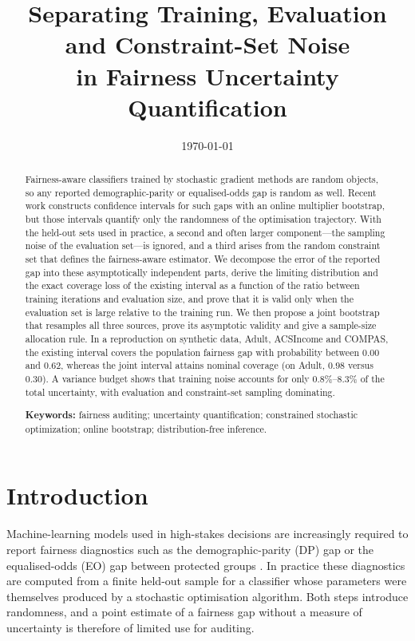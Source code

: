 \documentclass[10pt,twocolumn]{article}
\title{Separating Training, Evaluation and Constraint-Set Noise\\in Fairness Uncertainty Quantification}
\author{\todo{author list}}
\date{\today}
\begin{document}
\maketitle

\begin{abstract}
Fairness-aware classifiers trained by stochastic gradient methods are random objects, so any reported
demographic-parity or equalised-odds gap is random as well.  Recent work constructs confidence
intervals for such gaps with an online multiplier bootstrap, but those intervals quantify only the
randomness of the optimisation trajectory.  With the held-out sets used in practice, a second and
often larger component---the sampling noise of the evaluation set---is ignored, and a third arises
from the random constraint set that defines the fairness-aware estimator.  We decompose the error of
the reported gap into these asymptotically independent parts, derive the limiting distribution and
the exact coverage loss of the existing interval as a function of the ratio between training
iterations and evaluation size, and prove that it is valid only when the evaluation set is large
relative to the training run.  We then propose a joint bootstrap that resamples all three sources,
prove its asymptotic validity and give a sample-size allocation rule.  In a reproduction on synthetic
data, Adult, ACSIncome and COMPAS, the existing interval covers the population fairness gap with
probability between $0.00$ and $0.62$, whereas the joint interval attains nominal coverage (on Adult,
$0.98$ versus $0.30$).  A variance budget shows that training noise accounts for only
$0.8\%$--$8.3\%$ of the total uncertainty, with evaluation and constraint-set sampling dominating.

\par\medskip\noindent\textbf{Keywords:} fairness auditing; uncertainty quantification; constrained stochastic optimization; online bootstrap; distribution-free inference.
\end{abstract}

\section{Introduction}
\label{sec:intro}

Machine-learning models used in high-stakes decisions are increasingly required to report fairness
diagnostics such as the demographic-parity (DP) gap or the equalised-odds (EO) gap between protected
groups \citep{hardt2016,corbett2017}.  In practice these diagnostics are computed from a finite
held-out sample for a classifier whose parameters were themselves produced by a stochastic
optimisation algorithm.  Both steps introduce randomness, and a point estimate of a fairness gap
without a measure of uncertainty is therefore of limited use for auditing.
\end{document}
